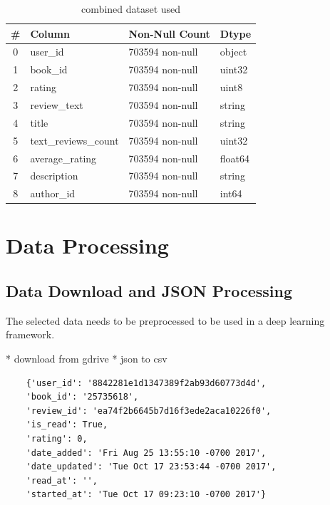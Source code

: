\documentclass[10pt,final,journal,a4paper,oneside,twocolumn]{IEEEtran}
\begin{document}
\begin{table}[h]
\begin{center}
        \begin{tabular}{clll}
        \toprule
        \# & Column & Non-Null Count & Dtype \\
        \midrule
        0 & user\_id & 703594 non-null & object \\
        1 & book\_id & 703594 non-null & uint32 \\
        2 & rating & 703594 non-null & uint8 \\
        3 & review\_text & 703594 non-null & string \\
        4 & title & 703594 non-null & string \\
        5 & text\_reviews\_count & 703594 non-null & uint32 \\
        6 & average\_rating & 703594 non-null & float64 \\
        7 & description & 703594 non-null & string \\
        8 & author\_id & 703594 non-null & int64 \\
        \bottomrule
        \end{tabular}
        \caption{combined dataset used}
        \label{tab:all_data}
    
\end{center}\end{table}
\section{Data Processing}
\subsection{Data Download and JSON Processing}
The selected data needs to be preprocessed to be used in a deep learning framework.

* download from gdrive
* json to csv
\begin{listing}[h]
    \begin{verbatim}
    {'user_id': '8842281e1d1347389f2ab93d60773d4d',                 
    'book_id': '25735618',                                         
    'review_id': 'ea74f2b6645b7d16f3ede2aca10226f0',               
    'is_read': True,                                               
    'rating': 0,                                                   
    'date_added': 'Fri Aug 25 13:55:10 -0700 2017',                
    'date_updated': 'Tue Oct 17 23:53:44 -0700 2017',              
    'read_at': '',                                                 
    'started_at': 'Tue Oct 17 09:23:10 -0700 2017'}
    \end{verbatim}
\end{listing}
\end{document}

